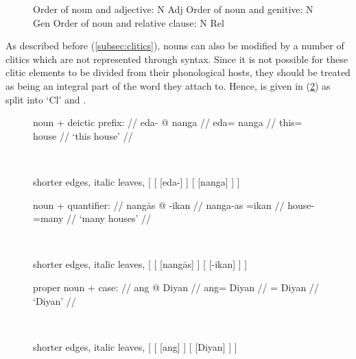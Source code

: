 \begin{figure}[h]
\pex\label{ex:nptyp}
\a Order of noun and adjective: N Adj
\a Order of noun and genitive: N Gen
\a Order of noun and relative clause: N Rel
\xe
\end{figure}

As described before (\autoref{subsec:clitics}), nouns can also be modified
by a number of clitics which are not represented through syntax. Since it is
not possible for these clitic elements to be divided from their phonological
hosts, they should be treated as being an integral part of the word they attach
to. Hence,  is given in (\ref{ex:nouncltree}) as split into `Cl' and
.

\begin{figure}
\pex\label{ex:nouncltree}
\a %
	\begin{minipage}[t]{.5\remaining}
	\begingl
		\glpreamble noun + deictic prefix: //
		\gla eda- @ nanga //
		\glb eda= nanga //
		\glc this= house //
		\glft `this house' //
	\endgl
	\end{minipage}
	~
	\begin{forest} shorter edges, italic leaves,
	[
		[
			[eda-]
		]
		[
			[nanga]
		]
	]
	\end{forest}

\a %
	\begin{minipage}[t]{.5\remaining}
	\begingl
		\glpreamble noun + quantifier: //
		\gla nangās @ -ikan //
		\glb nanga-as =ikan //
		\glc house-\Parg{} =many //
		\glft `many houses' //
	\endgl
	\end{minipage}
	~
	\begin{forest} shorter edges, italic leaves,
	[
		[
			[nangās]
		]
		[
			[-ikan]
		]
	]
	\end{forest}

\a %
	\begin{minipage}[t]{.5\remaining}
	\begingl
		\glpreamble proper noun + case: //
		\gla ang @ Diyan //
		\glb ang= Diyan //
		\glc \Aarg{}= Diyan //
		\glft `Diyan' //
	\endgl
	\end{minipage}
	~
	\begin{forest} shorter edges, italic leaves,
	[
		[
			[ang]
		]
		[
			[Diyan]
		]
	]
	\end{forest}

\xe
\end{figure}

